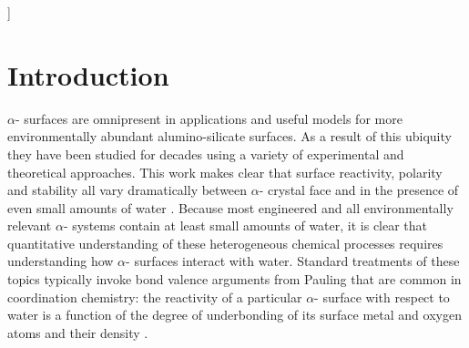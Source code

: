 \documentclass[twoside,twocolumn,9pt]{article}
\begin{document}
  ]

\renewcommand*\rmdefault{bch}\normalfont\upshape
\rmfamily
\section*{}
\vspace{-1cm}








\section{Introduction}
\label{sec1}
$\alpha$- surfaces are omnipresent in applications and useful models for more environmentally abundant alumino-silicate surfaces. As a result of this ubiquity they have been studied for decades using a variety of experimental and theoretical approaches\cite{brow99,eng00,Trainor02,Brown01,hass98,hass00, morterra1996case, kelb07}. This work makes clear that surface reactivity, polarity and stability all vary dramatically between $\alpha$- crystal face and in the presence of even small amounts of water \cite{ago2005aligned, ishigami2008crystal}. Because most engineered and all environmentally relevant $\alpha$- systems contain at least small amounts of water, it is clear that quantitative understanding of these heterogeneous chemical processes requires understanding how $\alpha$- surfaces interact with water. Standard treatments of these topics typically invoke bond valence arguments from Pauling that are common in coordination chemistry: the reactivity of a particular $\alpha$- surface with respect to water is a function of the degree of underbonding of its surface metal and oxygen atoms and their density \cite{pau29,hie91,stu96}. 
\end{document}
